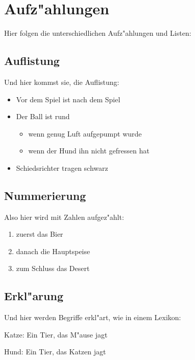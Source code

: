 \section{Aufz"ahlungen}


Hier folgen die unterschiedlichen Aufz"ahlungen und Listen:

\subsection{Auflistung}

Und hier kommst sie, die Auflistung:

\begin{itemize}
 \item Vor dem Spiel ist nach dem Spiel
 \item Der Ball ist rund
   \begin{itemize}
    \item wenn genug Luft aufgepumpt wurde
    \item wenn der Hund ihn nicht gefressen hat
   \end{itemize}
 \item Schiedsrichter tragen schwarz
\end{itemize}


\subsection{Nummerierung}

Also hier wird mit Zahlen aufgez"ahlt:

\begin{enumerate}
  \item zuerst das Bier
  \item danach die Hauptspeise
  \item zum Schluss das Desert
\end{enumerate}

\subsection{Erkl"arung}

Und hier werden Begriffe erkl"art, wie in einem Lexikon:

\begin{description}
  \item{Katze:} Ein Tier, das M"ause jagt
  \item{Hund:} Ein Tier, das Katzen jagt
\end{description}

